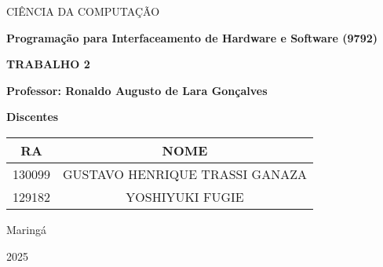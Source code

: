 \begin{titlepage}
\begin{center}
       {CIÊNCIA DA COMPUTAÇÃO}

       \vspace{2cm}
       
       \textbf{Programação para Interfaceamento de Hardware e Software (9792)}
  
       \vspace{1cm}

       \textbf{TRABALHO 2}

       \vfill
       
       \textbf{Professor: Ronaldo Augusto de Lara Gonçalves}
       
       \vspace{1cm}

       \textbf{Discentes}
       \begin{table}[h]
           \centering
           \begin{tabular}{|c|c|}\hline
                RA & NOME \\ \hline
                130099 & GUSTAVO HENRIQUE TRASSI GANAZA\\ \hline
                129182 & YOSHIYUKI FUGIE \\ \hline
            \end{tabular}
       \end{table}

            Maringá
            
            2025
\end{center}
\end{titlepage}